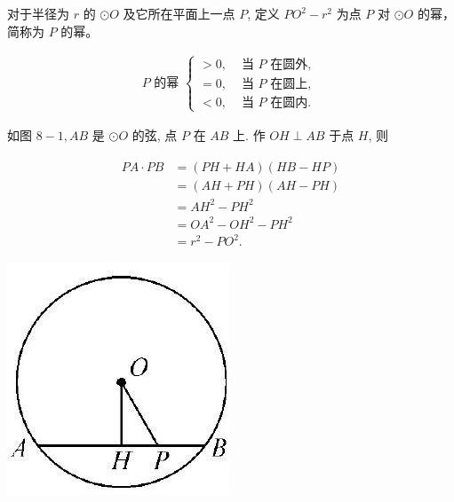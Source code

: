 \documentclass[10pt]{article}
\begin{document}
对于半径为 $r$ 的 $\odot O$ 及它所在平面上一点 $P$, 定义 $P O^{2}-r^{2}$ 为点 $P$ 对 $\odot O$ 的幂，简称为 $P$ 的幂。

\begin{align*}
P \text { 的幂 } \begin{cases}>0, & \text { 当 } P \text { 在圆外, } \\ =0, & \text { 当 } P \text { 在圆上, } \\ <0, & \text { 当 } P \text { 在圆内. }\end{cases}
\end{align*}

如图 $8-1, A B$ 是 $\odot O$ 的弦, 点 $P$ 在 $A B$ 上. 作 $O H \perp A B$ 于点 $H$, 则

\begin{align*}
\begin{aligned}
P A \cdot P B & =(P H+H A)(H B-H P) \\
& =(A H+P H)(A H-P H) \\
& =A H^{2}-P H^{2} \\
& =O A^{2}-O H^{2}-P H^{2} \\
& =r^{2}-P O^{2} .
\end{aligned}
\end{align*}

\begin{center}
\includegraphics[max width=\textwidth]{2024_10_30_66b8e5e701da2093c133g-058}
\end{center}
\end{document}
